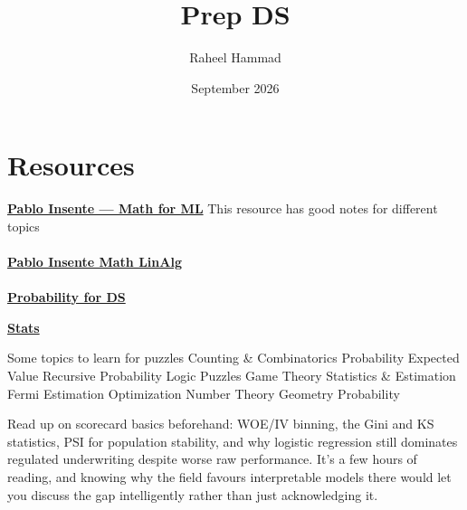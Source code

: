 \documentclass{article}
\title{Prep DS}
\author{Raheel Hammad}
\date{September 2026}
\begin{document}
\maketitle

\section{Resources}

\href{https://pabloinsente.github.io/}{\textbf{Pablo Insente — Math for ML}} This resource has good notes for different topics \\ \\

\href{https://pabloinsente.github.io/intro-linear-algebra}{\textbf{Pablo Insente Math LinAlg}} \\ \\ 

\href{https://probability4datascience.com/}{\textbf{Probability for DS}}

\href{https://www.scribbr.com/category/statistics/}{\textbf{Stats}}

Some topics to learn for puzzles 
Counting & Combinatorics
Probability
Expected Value
Recursive Probability
Logic Puzzles
Game Theory
Statistics & Estimation
Fermi Estimation
Optimization
Number Theory
Geometry Probability


Read up on scorecard basics beforehand: WOE/IV binning, the Gini and KS statistics, PSI for population stability, and why logistic regression still dominates regulated underwriting despite worse raw performance. It’s a few hours of reading, and knowing why the field favours interpretable models there would let you discuss the gap intelligently rather than just acknowledging it.
\end{document}
